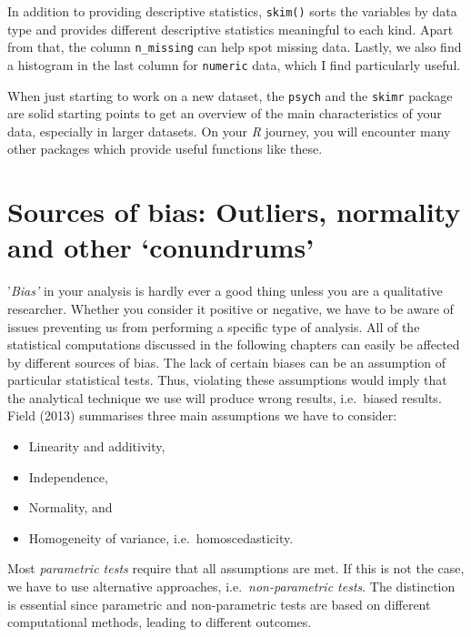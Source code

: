 \documentclass[
  letterpaper,
]{krantz}
\begin{document}
In addition to providing descriptive statistics, \texttt{skim()} sorts
the variables by data type and provides different descriptive statistics
meaningful to each kind. Apart from that, the column \texttt{n\_missing}
can help spot missing data. Lastly, we also find a histogram in the last
column for \texttt{numeric} data, which I find particularly useful.

When just starting to work on a new dataset, the \texttt{psych} and the
\texttt{skimr} package are solid starting points to get an overview of
the main characteristics of your data, especially in larger datasets. On
your \emph{R} journey, you will encounter many other packages which
provide useful functions like these.


\chapter{Sources of bias: Outliers, normality and other
`conundrums'}\label{sources-of-bias}

'\emph{Bias'} in your analysis is hardly ever a good thing unless you
are a qualitative researcher. Whether you consider it positive or
negative, we have to be aware of issues preventing us from performing a
specific type of analysis. All of the statistical computations discussed
in the following chapters can easily be affected by different sources of
bias. The lack of certain biases can be an assumption of particular
statistical tests. Thus, violating these assumptions would imply that
the analytical technique we use will produce wrong results, i.e.~biased
results. Field (2013) summarises three main assumptions we have to
consider:

\begin{itemize}
\item
  Linearity and additivity,
\item
  Independence,
\item
  Normality, and
\item
  Homogeneity of variance, i.e.~homoscedasticity.
\end{itemize}

Most \emph{parametric tests} require that all assumptions are met. If
this is not the case, we have to use alternative approaches,
i.e.~\emph{non-parametric tests}. The distinction is essential since
parametric and non-parametric tests are based on different computational
methods, leading to different outcomes.
\end{document}
